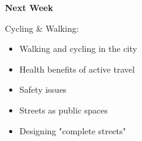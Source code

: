 \documentclass[aspectratio=169]{beamer}
\begin{document}
\begin{frame}
	\textbf{Next Week} 
	
	\vspace{4mm}
	
	Cycling \& Walking:
	
	\begin{itemize}
		
		
		
		\item Walking and cycling in the city
		
		\item Health benefits of active travel
		
		\item Safety issues
		
		\item Streets as public spaces
		
		\item Designing "complete streets"
		
		
		
	\end{itemize}

\end{frame}
\end{document}
